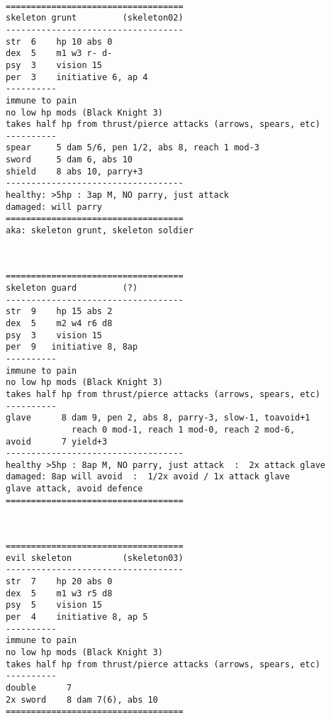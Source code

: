 \

\goodbreak \begin{samepage} \small \begin{verbatim}
===================================
skeleton grunt         (skeleton02)
-----------------------------------
str  6    hp 10 abs 0
dex  5    m1 w3 r- d-
psy  3    vision 15
per  3    initiative 6, ap 4
----------
immune to pain
no low hp mods (Black Knight 3)
takes half hp from thrust/pierce attacks (arrows, spears, etc)
----------
spear     5 dam 5/6, pen 1/2, abs 8, reach 1 mod-3
sword     5 dam 6, abs 10
shield    8 abs 10, parry+3
-----------------------------------
healthy: >5hp : 3ap M, NO parry, just attack
damaged: will parry
===================================
aka: skeleton grunt, skeleton soldier
\end{verbatim} \normalsize \end{samepage}

\

\goodbreak \begin{samepage} \small \begin{verbatim}
===================================
skeleton guard         (?)
-----------------------------------
str  9    hp 15 abs 2
dex  5    m2 w4 r6 d8
psy  3    vision 15
per  9   initiative 8, 8ap
----------
immune to pain
no low hp mods (Black Knight 3)
takes half hp from thrust/pierce attacks (arrows, spears, etc)
----------
glave      8 dam 9, pen 2, abs 8, parry-3, slow-1, toavoid+1
             reach 0 mod-1, reach 1 mod-0, reach 2 mod-6,
avoid      7 yield+3
-----------------------------------
healthy >5hp : 8ap M, NO parry, just attack  :  2x attack glave
damaged: 8ap will avoid  :  1/2x avoid / 1x attack glave
glave attack, avoid defence
===================================
\end{verbatim} \normalsize \end{samepage}

\

\goodbreak \begin{samepage} \small \begin{verbatim}
===================================
evil skeleton          (skeleton03)
-----------------------------------
str  7    hp 20 abs 0
dex  5    m1 w3 r5 d8
psy  5    vision 15
per  4    initiative 8, ap 5
----------
immune to pain
no low hp mods (Black Knight 3)
takes half hp from thrust/pierce attacks (arrows, spears, etc)
----------
double      7
2x sword    8 dam 7(6), abs 10
===================================
\end{verbatim} \normalsize \end{samepage}

